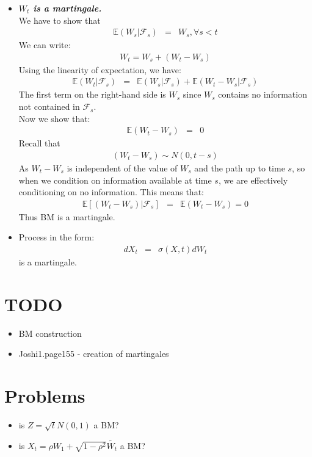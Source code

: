 \begin{itemize}
	\item \textbf{\textit{$W_{t}$ is a martingale.}}\\
	We have to show that
	\begin{eqnarray}
	\mathbb{E}(W_{s}\vert\mathscr{F}_{s}) &=& W_{s}, \forall s < t
	\end{eqnarray}
	We can write:
	\begin{eqnarray}
	W_{t} = W_{s} + (W_{t} - W_{s})
	\end{eqnarray}
	Using the linearity of expectation, we have:
	\begin{eqnarray}
	\mathbb{E}(W_{t}\vert \mathscr{F}_{s}) &=& \mathbb{E}(W_{s}\vert \mathscr{F}_{s}) + \mathbb{E}(W_{t} - W_{s}\vert\mathscr{F}_{s})
	\end{eqnarray}
	The first term on the right-hand side is $W_{s}$ since $W_{s}$ contains no information not contained in $\mathscr{F}_{s}$.\\
	Now we show that:\\
	\begin{eqnarray}
	\mathbb{E}(W_{t} - W_{s}) &=& 0
	\end{eqnarray}
	Recall that
	\begin{eqnarray}
	(W_{t} - W_{s}) \sim N(0, t - s)
	\end{eqnarray}
	As $W_{t} - W_{s}$ is independent of the value of $W_{s}$ and the path up to time $s$, so when we condition on information available at time $s$, we are effectively conditioning on no information. This means that:
	\begin{eqnarray}
	\mathbb{E}[(W_{t} - W_{s})\vert \mathscr{F}_{s}]&=& \mathbb{E}(W_{t} - W_{s}) = 0
	\end{eqnarray}
	Thus BM is a martingale.
	\item Process in the form:
	\begin{eqnarray}
	dX_{t} &=& \sigma(X, t)dW_{t}
	\end{eqnarray}
	is a martingale.
\end{itemize}

\section{TODO}
\begin{itemize}
	\item BM construction
	\item Joshi1.page155 - creation of martingales 
\end{itemize}


\section{Problems}
\begin{itemize}
	\item is $Z = \sqrt{t}N(0,1)$ a BM?
	\item is $X_{t} = \rho W_{1} + \sqrt{1 - \rho^{2}}\tilde{W_{t}}$ a BM?
\end{itemize}
